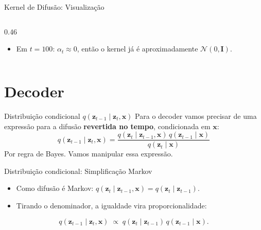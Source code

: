 \documentclass[aspectratio=169,xcolor=dvipsnames]{beamer}
\begin{document}
\begin{frame}{Kernel de Difusão: Visualização}
\begin{columns}[T]
\begin{column}{0.46\textwidth}
\begin{itemize}
          \item Em $t = 100$: $\alpha_t \approx 0$, então o kernel já é
          aproximadamente $\mathcal{N}(0,\mathbf{I})$.
        \end{itemize}
      \end{column}
    \end{columns}
  \end{frame}

  \section{Decoder}


  \begin{frame}{Distribuição condicional $q(\mathbf{z}_{t-1} \mid \mathbf{z}_t, \mathbf{x})$}
    Para o decoder vamos precisar de uma expressão para a difusão
    \textbf{revertida no tempo}, condicionada em $\mathbf{x}$:
    \vspace{0.3em}
    \[
      q(\mathbf{z}_{t-1} \mid \mathbf{z}_t, \mathbf{x}) = \frac{q(\mathbf{z}_t \mid \mathbf{z}_{t-1}, \mathbf{x})\, q(\mathbf{z}_{t-1} \mid \mathbf{x})}{q(\mathbf{z}_t \mid \mathbf{x})}
    \]
    \vspace{0.3em}
    Por regra de Bayes. Vamos manipular essa expressão.
  \end{frame}

  \begin{frame}{Distribuição condicional: Simplificação Markov}
    \begin{itemize}
      \item Como difusão é Markov:
      $q(\mathbf{z}_t \mid \mathbf{z}_{t-1}, \mathbf{x}) = q(\mathbf{z}_t \mid \mathbf{z}_{t-1})$.
      \item Tirando o denominador, a igualdade vira proporcionalidade:
    \end{itemize}
    \vspace{0.3em}
    \[
      q(\mathbf{z}_{t-1} \mid \mathbf{z}_t, \mathbf{x}) \;\propto\; q(\mathbf{z}_t \mid \mathbf{z}_{t-1})\, q(\mathbf{z}_{t-1} \mid \mathbf{x}).
    \]
  \end{frame}
\end{document}
